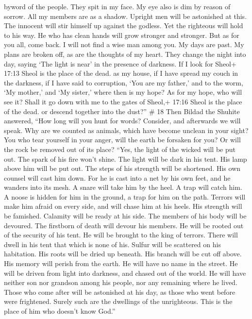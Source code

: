 byword of the people. They spit in my face.  My eye also is
dim by reason of sorrow. All my members are as a shadow. 
Upright men will be astonished at this. The innocent will stir himself
up against the godless.  Yet the righteous will hold to his
way. He who has clean hands will grow stronger and stronger.
 But as for you all, come back. I will not find a wise man
among you.  My days are past. My plans are broken off, as
are the thoughts of my heart.  They change the night into
day, saying `The light is near' in the presence of darkness.
 If I look for Sheol+ 17:13 Sheol is the place of the dead.
as my house, if I have spread my couch in the darkness,  if
I have said to corruption, `You are my father,' and to the worm, `My
mother,' and `My sister,'  where then is my hope? As for my
hope, who will see it?  Shall it go down with me to the
gates of Sheol,+ 17:16 Sheol is the place of the dead. or descend
together into the dust?'' \# 18  Then Bildad the Shuhite
answered,  ``How long will you hunt for words? Consider, and
afterwards we will speak.  Why are we counted as animals,
which have become unclean in your sight?  You who tear
yourself in your anger, will the earth be forsaken for you? Or will the
rock be removed out of its place?  ``Yes, the light of the
wicked will be put out. The spark of his fire won't shine. 
The light will be dark in his tent. His lamp above him will be put out.
 The steps of his strength will be shortened. His own
counsel will cast him down.  For he is cast into a net by
his own feet, and he wanders into its mesh.  A snare will
take him by the heel. A trap will catch him.  A noose is
hidden for him in the ground, a trap for him on the path. 
Terrors will make him afraid on every side, and will chase him at his
heels.  His strength will be famished. Calamity will be
ready at his side.  The members of his body will be
devoured. The firstborn of death will devour his members. 
He will be rooted out of the security of his tent. He will be brought to
the king of terrors.  There will dwell in his tent that
which is none of his. Sulfur will be scattered on his habitation.
 His roots will be dried up beneath. His branch will be cut
off above.  His memory will perish from the earth. He will
have no name in the street.  He will be driven from light
into darkness, and chased out of the world.  He will have
neither son nor grandson among his people, nor any remaining where he
lived.  Those who come after will be astonished at his day,
as those who went before were frightened.  Surely such are
the dwellings of the unrighteous. This is the place of him who doesn't
know God.''

